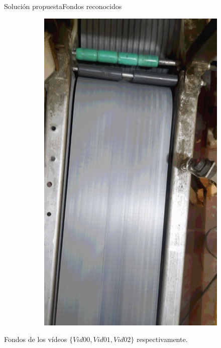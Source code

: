 \documentclass{beamer}
\begin{document}
\begin{frame}{Solución propuesta}{Fondos reconocidos}
\begin{figure}
\begin{subfigure}[b]{0.3\textwidth}
        \includegraphics[width=\textwidth]{img/F3.png}
    \end{subfigure}
\end{figure}
Fondos de los vídeos $\lbrace Vid00, Vid01, Vid02 \rbrace$ respectivamente.
\end{frame}
\end{document}
